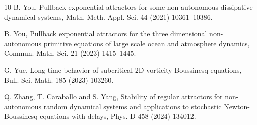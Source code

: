 \documentclass[oneside,preprint,12pt,numbers,sort&compress]{elsarticle}
\begin{document}
\begin{thebibliography}{10}
B. You, Pullback exponential attractors for some non-autonomous dissipative dynamical systems, Math. Meth. Appl. Sci. 44 (2021) 10361--10386. %

B. You, Pullback exponential attractors for the three dimensional non-autonomous primitive equations of large scale ocean and atmosphere dynamics, Commun. Math. Sci. 21 (2023) 1415--1445. %

G. Yue, Long-time behavior of subcritical 2D vorticity Boussinesq equations, Bull. Sci. Math. 185 (2023) 103260.%

Q. Zhang, T. Caraballo and S. Yang, Stability of regular attractors for non-autonomous random dynamical systems and applications to stochastic Newton-Boussinesq equations with delays, Phys. D 458 (2024) 134012.%


\end{thebibliography}
\end{document}
